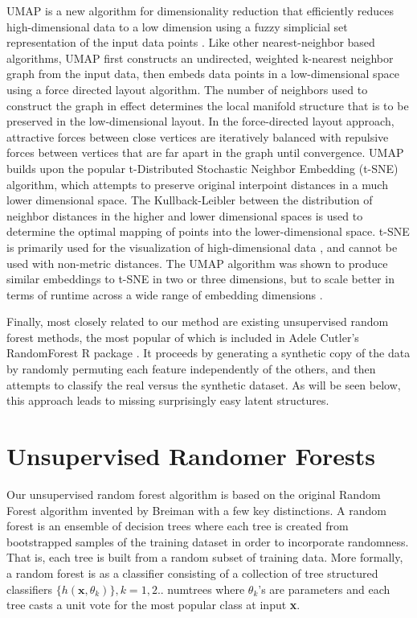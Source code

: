 UMAP is a new algorithm for dimensionality reduction
that efficiently reduces high-dimensional data
to a low dimension using a fuzzy simplicial set representation of the input data points \cite{mcinnes2018umap}.
Like other nearest-neighbor based algorithms,
UMAP first constructs an undirected, weighted k-nearest neighbor 
graph from the input data, then
embeds data points in a low-dimensional space
using a force directed layout algorithm.
The number of neighbors used to construct the
graph in effect determines the local manifold structure that is to be preserved in the 
low-dimensional layout.
In the force-directed layout approach, 
attractive forces between close vertices
are iteratively balanced with repulsive forces between
vertices that are far apart in the graph
until convergence.
UMAP builds upon the popular 
t-Distributed Stochastic Neighbor Embedding (t-SNE) algorithm, which  
attempts to preserve original interpoint distances in a 
much lower dimensional space. The Kullback-Leibler 
between the distribution of neighbor distances in the higher and lower dimensional spaces is used to determine the optimal mapping of points into the lower-dimensional space.
t-SNE is primarily used for the visualization of high-dimensional data \cite{maaten2008visualizing},
and cannot be used with non-metric distances. The UMAP algorithm was shown to produce similar embeddings to t-SNE in two or three dimensions, 
but to scale better in terms of runtime across a wide range of embedding dimensions \cite{mcinnes2018umap}. 

Finally, most closely related to our method are existing unsupervised random forest methods, the most popular of which is included in Adele Cutler's RandomForest R package \cite{Shi2006-ka}.  It proceeds by generating a synthetic copy of the data by randomly permuting each feature independently of the others, and then attempts to classify the real versus the synthetic dataset.  As will be seen below, this approach leads to missing surprisingly easy latent structures.


\section{Unsupervised Randomer Forests}
Our unsupervised random forest algorithm is based on the original Random Forest algorithm invented by Breiman \cite{breiman2001random} with a few key distinctions. 
%
A random forest is an ensemble of decision trees where each tree is created from bootstrapped samples of the training dataset in order to incorporate randomness. That is, each tree is built from a random subset of training data. More formally, a random forest is as a classifier consisting of a collection of tree structured classifiers $\{h(\textbf{x}, \theta_k)\}, k=1, 2..$ numtrees where $\theta_k$'s  are parameters and each tree casts a unit vote for the most popular class at input \textbf{x}. 
 
